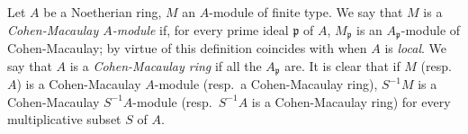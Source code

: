 \begin{env}[16.5.13]
\label{0.16.5.13}
Let $A$ be a Noetherian ring, $M$ an $A$-module of finite type.
We say that $M$ is a \emph{Cohen-Macaulay $A$-module} if, for every prime ideal $\mathfrak{p}$ of $A$, $M_\mathfrak{p}$ is an $A_\mathfrak{p}$-module of Cohen-Macaulay; by virtue of  this definition coincides with  when $A$ is \emph{local}.
We say that $A$ is a \emph{Cohen-Macaulay ring} if all the $A_\mathfrak{p}$ are.
It is clear that if $M$ (resp.~$A$) is a Cohen-Macaulay $A$-module (resp.~a Cohen-Macaulay ring), $S^{-1}M$ is a Cohen-Macaulay $S^{-1}A$-module (resp.~$S^{-1}A$ is a Cohen-Macaulay ring) for every multiplicative subset $S$ of $A$.
\end{env}
